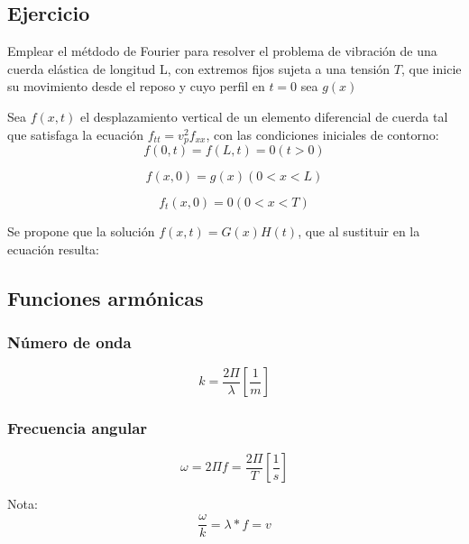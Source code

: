 \documentclass[]{article}
\begin{document}
\subsection{Ejercicio}

Emplear el métdodo de Fourier para resolver el problema de vibración de una cuerda elástica de longitud L, con extremos fijos sujeta a una tensión $T$, que inicie su movimiento desde el reposo y cuyo perfil en $t=0$ sea $g(x)$

Sea $f(x,t)$ el desplazamiento vertical de un elemento diferencial de cuerda tal que satisfaga la ecuación $f_{tt}=v_p^2 f_{xx}$, con las condiciones iniciales de contorno:\\

\begin{equation}
f(0,t)=f(L,t)=0 (t>0)
\end{equation}

\begin{equation}
f(x,0)=g(x)  (0<x<L)
\end{equation}

\begin{equation}
f_t(x,0)=0   (0<x<T)
\end{equation}

Se propone que la solución $f(x,t)=G(x)H(t)$, que al sustituir en la ecuación resulta:

\subsection{Funciones armónicas}

\subsubsection{Número de onda}

\begin{equation}
k=\frac{2 \Pi}{\lambda}[\frac{1}{m}]
\end{equation}

\subsubsection{Frecuencia angular}

\begin{equation}
\omega = 2 \Pi f=\frac{2 \Pi}{T}[\frac{1}{s}]
\end{equation}

Nota:\\

\begin{equation}
\frac{\omega}{k}=\lambda * f=v
\end{equation}
\end{document}
